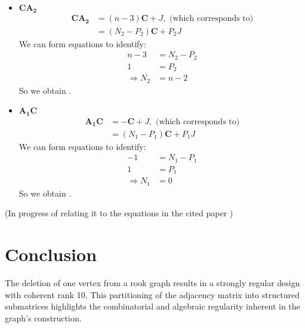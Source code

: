 \documentclass{article}
\begin{document}
\begin{itemize}
    \item \(\mathbf{CA_2}\)
    \begin{align*}
        \mathbf{CA_2} 
        &= (n-3)\mathbf{C} + J,
        \text{ (which corresponds to)}\\
        &= (N_2-P_2)\mathbf{C} + P_2J
    \end{align*}
    We can form equations to identify:
    \begin{align*}
        n-3 &= N_2 - P_2 \\
        1 &= P_2 \\
        \Rightarrow N_2 &= n-2
    \end{align*}
    So we obtain .

    \item \(\mathbf{A_1C}\)
    \begin{align*}
        \mathbf{A_1C} 
        &= -\mathbf{C} + J,
        \text{ (which corresponds to)}\\
        &= (N_1-P_1)\mathbf{C} + P_1J
    \end{align*}
    We can form equations to identify:
    \begin{align*}
        -1 &= N_1 - P_1 \\
        1 &= P_1 \\
        \Rightarrow N_1 &= 0
    \end{align*}
    So we obtain .
\end{itemize}

(In progress of relating it to the equations in the cited paper \cite{sankey_srd})


\newpage
\section*{Conclusion}

The deletion of one vertex from a rook graph results in a strongly regular design with coherent rank 10. This partitioning of the adjacency matrix into structured submatrices highlights the combinatorial and algebraic regularity inherent in the graph's construction. 




\end{document}
